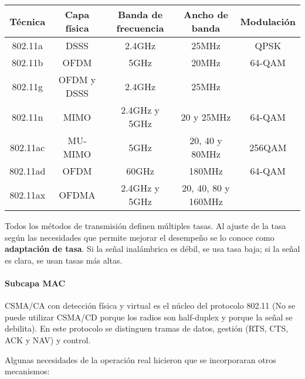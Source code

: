 \documentclass{book}
\begin{document}
	\begin{table}[H]
		\centering
		\begin{tabular}{|c|c|c|c|c|}
			\hline
			Técnica&Capa física&Banda de frecuencia&Ancho de banda&Modulación\\
			\hline
			\hline
			802.11a&DSSS&2.4GHz&25MHz&QPSK\\
			\hline
			802.11b&OFDM&5GHz&20MHz&64-QAM\\
			\hline
			802.11g&OFDM y DSSS&2.4GHz&25MHz&\\
			\hline
			802.11n&MIMO&2.4GHz y 5GHz&20 y 25MHz&64-QAM\\
			\hline
			802.11ac&MU-MIMO&5GHz&20, 40 y 80MHz&256QAM\\
			\hline
			802.11ad&OFDM&60GHz&180MHz&64-QAM\\
			\hline
			802.11ax&OFDMA\footnotemark&2.4GHz y 5GHz&20, 40, 80 y 160MHz&\\
			\hline
		\end{tabular}
	\end{table}
	
	
	\vspace{3mm}
	Todos los métodos de transmisión definen múltiples tasas. Al ajuste de la tasa según las necesidades que permite mejorar el desempeño se lo conoce como \textbf{adaptación de tasa}. Si la señal inalámbrica es débil, se usa tasa baja; si la señal es clara, se usan tasas más altas.
	
	\paragraph{Subcapa MAC}
	CSMA/CA con detección física y virtual es el núcleo del protocolo 802.11 (No se puede utilizar CSMA/CD porque los radios son half-duplex y porque la señal se debilita). En este protocolo se distinguen tramas de datos, gestión (RTS, CTS, ACK y NAV) y control.
	
	\vspace{3mm}
	Algunas necesidades de la operación real hicieron que se incorporaran otros mecanismos:
	
\end{document}
